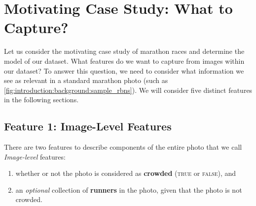 \section{Motivating Case Study: What to Capture?}
\label{sec:dataset:architecture:what_to_capture}

Let us consider the motivating case study of marathon races and determine the model of our dataset. What features do we want to capture from images within our dataset? To answer this question, we need to consider what information we see as relevant in a standard marathon photo (such as \cref{fig:introduction:background:sample_rbns}). We will consider five distinct features in the following sections.

\subsection{Feature 1: Image-Level Features}

There are two features to describe components of the entire photo that we call \textit{Image-level} features:

\begin{enumerate}
  \item whether or not the photo is considered as \textbf{crowded} (\textsc{true} or \textsc{false}), and
  \item an \textit{optional} collection of \textbf{runners} in the photo, given that the photo is not crowded.
\end{enumerate}

